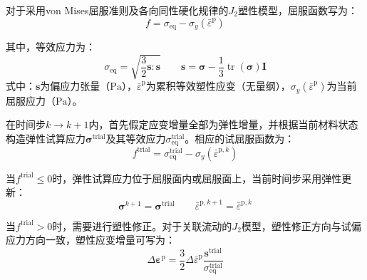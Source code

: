 对于采用von Mises屈服准则及各向同性硬化规律的$J_2$塑性模型，屈服函数写为：
\begin{equation}
	f
	=
	\sigma_{\mathrm{eq}}
	-
	\sigma_y\left(\bar{\varepsilon}^{\mathrm{p}}\right)
	\label{eq:ch4_j2_yield}
\end{equation}

其中，等效应力为：
\begin{equation}
	\sigma_{\mathrm{eq}}
	=
	\sqrt{\frac{3}{2}
		\boldsymbol{s}:\boldsymbol{s}}
	\qquad
	\boldsymbol{s}
	=
	\boldsymbol{\sigma}
	-\frac{1}{3}\operatorname{tr}
	(\boldsymbol{\sigma})\mathbf{I}
	\label{eq:ch4_equivalent_stress}
\end{equation}
\noindent 式中：$\boldsymbol{s}$为偏应力张量（$\mathrm{Pa}$），$\bar{\varepsilon}^{\mathrm{p}}$为累积等效塑性应变（无量纲），$\sigma_y\left(\bar{\varepsilon}^{\mathrm{p}}\right)$为当前屈服应力（$\mathrm{Pa}$）。

在时间步$k\rightarrow k+1$内，首先假定应变增量全部为弹性增量，并根据当前材料状态构造弹性试算应力$\boldsymbol{\sigma}^{\mathrm{trial}}$及其等效应力$\sigma_{\mathrm{eq}}^{\mathrm{trial}}$。相应的试屈服函数为：
\begin{equation}
	f^{\mathrm{trial}}
	=
	\sigma_{\mathrm{eq}}^{\mathrm{trial}}
	-
	\sigma_y\left(\bar{\varepsilon}^{\mathrm p,k}\right)
	\label{eq:ch4_trial_yield}
\end{equation}

当$f^{\mathrm{trial}}\leq 0$时，弹性试算应力位于屈服面内或屈服面上，当前时间步采用弹性更新：
\begin{equation}
	\boldsymbol{\sigma}^{k+1}
	=
	\boldsymbol{\sigma}^{\mathrm{trial}}
	\qquad
	\bar{\varepsilon}^{\mathrm p,k+1}
	=
	\bar{\varepsilon}^{\mathrm p,k}
	\label{eq:ch4_elastic_update}
\end{equation}

当$f^{\mathrm{trial}}>0$时，需要进行塑性修正。对于关联流动的$J_2$模型，塑性修正方向与试偏应力方向一致，塑性应变增量可写为：
\begin{equation}
	\Delta\boldsymbol{\varepsilon}^{\mathrm{p}}
	=
	\frac{3}{2}
	\Delta\bar{\varepsilon}^{\mathrm{p}}
	\frac{\boldsymbol{s}^{\mathrm{trial}}}
	{\sigma_{\mathrm{eq}}^{\mathrm{trial}}}
	\label{eq:ch4_plastic_strain_increment}
\end{equation}

